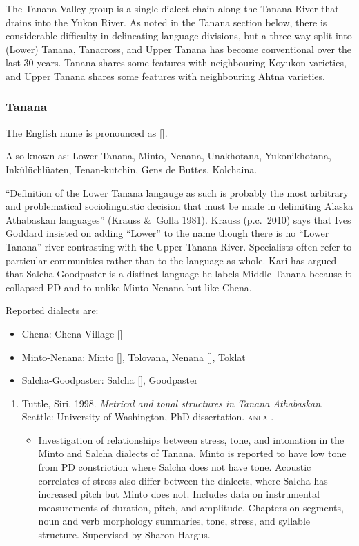 \documentclass[12pt,letterpaper,oneside,article]{memoir}
\begin{document}
The Tanana Valley group is a single dialect chain along the Tanana River that drains into the Yukon River.
As noted in the Tanana section below, there is considerable difficulty in delineating language divisions, but a three way split into (Lower) Tanana, Tanacross, and Upper Tanana has become conventional over the last 30 years.
Tanana shares some features with neighbouring Koyukon varieties, and Upper Tanana shares some features with neighbouring Ahtna varieties.

\subsubsection{Tanana}\label{sec:tanana}

The English name  is pronounced as [].

Also known as: Lower Tanana, Minto, Nenana, Unakhotana, Yukonikhotana, Inkülüchlüaten, Tenan-kutchin, Gens de Buttes, Kolchaina.

“Definition of the Lower Tanana langauge as such is probably the most arbitrary and problematical sociolinguistic decision that must be made in delimiting Alaska Athabaskan languages” (Krauss \&\ Golla 1981).
Krauss (p.c.\ 2010) says that Ives Goddard insisted on adding “Lower” to the name though there is no “Lower Tanana” river contrasting with the Upper Tanana River.
Specialists often refer to particular communities rather than to the language as whole.
Kari has argued that Salcha-Goodpaster is a distinct language he labels Middle Tanana because it collapsed PD  and  to  unlike Minto-Nenana but like Chena.

	
Reported dialects are:
\begin{itemize}
\item	Chena: Chena Village []
\item	Minto-Nenana: Minto [], Tolovana, Nenana [], Toklat
\item	Salcha-Goodpaster: Salcha [], Goodpaster
\end{itemize}

\begin{enumerate}
\item	Tuttle, Siri.
	1998.
	\textit{Metrical and tonal structures in Tanana Athabaskan}.
	Seattle: University of Washington, PhD dissertation.
	\textsc{anla} .
	\begin{itemize}
	\item	Investigation of relationships between stress, tone, and intonation
		in the Minto and Salcha dialects of Tanana.
		Minto is reported to have low tone from PD constriction where Salcha
		does not have tone.
		Acoustic correlates of stress also differ between the dialects, where
		Salcha has increased pitch but Minto does not.
		Includes data on instrumental measurements of duration, pitch, and amplitude.
		Chapters on segments, noun and verb morphology summaries, tone, stress, and
		syllable structure.
		Supervised by Sharon Hargus.
	\end{itemize}
\end{enumerate}
\end{document}
